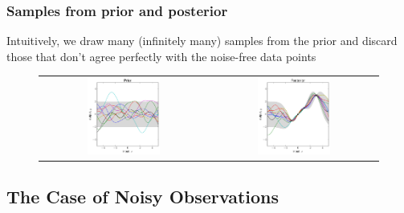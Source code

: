 \begin{frame}
\frametitle{Samples from prior and posterior}
Intuitively, we draw many (infinitely many) samples from the prior and discard those that don't agree
perfectly with the noise-free data points
\begin{figure}
    \begin{tabular}{cc}
        \includegraphics[width=0.45\textwidth]{images/plots/fct_space_prior_wo_noise.pdf} &
        \includegraphics[width=0.45\textwidth]{images/plots/fct_space_posterior_wo_noise.pdf}
    \end{tabular}
\end{figure}
\end{frame}




\subsection{The Case of Noisy Observations}
\begin{frame}
\tableofcontents[currentsubsection]
\end{frame}

